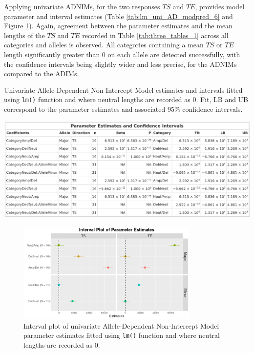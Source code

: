Applying univariate ADNIMs, for the two responses $TS$ and $TE$, provides model parameter and interval estimates (Table \ref{tab:lm_uni_AD_modpred_6} and Figure \ref{fig:lm_uni_AD_modpred_6}). Again, agreement between the parameter estimates and the mean lengths of the $TS$ and $TE$ recorded in Table \ref{tab:three_tables_1} across all categories and alleles is observed. All categories containing a mean $TS$ or $TE$ length significantly greater than 0 on each allele are detected successfully, with the confidence intervals being slightly wider and less precise, for the ADNIMs compared to the ADIMs.

\vfill 
\begin{table}[H]
\centering
\caption[Univariate Allele-Dependent Non-Intercept Model estimates and intervals fitted using \texttt{lm()} function.]{Univariate Allele-Dependent Non-Intercept Model estimates and intervals fitted using \texttt{lm()} function and where neutral lengths are recorded as 0. Fit, LB and UB correspond to the parameter estimates and associated 95\% confidence intervals. }
      
\includegraphics[width = 1\textwidth]{../tables/Chapter_5/Univariate_lm_6_AD_Model_Pred.png}
\label{tab:lm_uni_AD_modpred_6}
\end{table}
\vspace{0.3cm}
\begin{figure}[H] 
\centering
\includegraphics[width = 0.80\textwidth]{../figures/Chapter_5/Univariate_lm_6_AD_Interval.png}
 
\caption[Interval plot of univariate Allele-Dependent Non-Intercept Model parameter estimates fitted using \texttt{lm()} function.]{Interval plot of univariate Allele-Dependent Non-Intercept Model parameter estimates fitted using \texttt{lm()} function and where neutral lengths are recorded as 0.}
\label{fig:lm_uni_AD_modpred_6}
\end{figure}
\vfill 
\clearpage 

